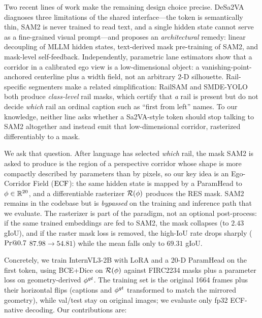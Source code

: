 Two recent lines of work make the remaining design choice precise.
DeSa2VA \citep{dang2025desa2va} diagnoses three limitations of the shared \Seg{} interface---the token is semantically thin, SAM2 is never trained to read text, and a single hidden state cannot serve as a fine-grained visual prompt---and proposes an \emph{architectural} remedy: linear decoupling of MLLM hidden states, text-derived mask pre-training of SAM2, and mask-level self-feedback.
Independently, parametric lane estimators \citep{tabelini2021polylanenet,feng2022bezierlanenet} show that a corridor in a calibrated ego view is a low-dimensional object: a vanishing-point-anchored centerline plus a width field, not an arbitrary 2-D silhouette.
Rail-specific segmenters make a related simplification: RailSAM \citep{zhang2025railsam} and SMDE-YOLO \citep{lin2026smdeyolo} both produce \emph{class-level} rail masks, which certify that \emph{a} rail is present but do not decide \emph{which} rail an ordinal caption such as ``first from left'' names.
To our knowledge, neither line asks whether a Sa2VA-style \Seg{} token should stop talking to SAM2 altogether and instead emit that low-dimensional corridor, rasterized differentiably to a mask.

We ask that question.
After language has selected \emph{which} rail, the mask SAM2 is asked to produce is the region of a perspective corridor whose shape is more compactly described by parameters than by pixels, so our key idea is an Ego-Corridor Field ($\mathrm{ECF}$): the same \Seg{} hidden state is mapped by a ParamHead to $\phi \in \mathbb{R}^{20}$, and a differentiable rasterizer $\mathcal{R}(\phi)$ produces the RES mask.
SAM2 remains in the codebase but is \emph{bypassed} on the training and inference path that we evaluate.
The rasterizer is part of the paradigm, not an optional post-process: if the same trained embeddings are fed to SAM2, the mask collapses (to $2.43$ gIoU), and if the raster mask loss is removed, the high-IoU rate drops sharply ($\mathrm{Pr@}0.7$ $87.98\to54.81$) while the mean falls only to $69.31$ gIoU.

Concretely, we train InternVL3-2B with LoRA and a 20-D ParamHead on the first \Seg{} token, using BCE+Dice on $\mathcal{R}(\phi)$ against FIRC2234 masks plus a parameter loss on geometry-derived $\phi^{gt}$.
The training set is the original 1664 frames plus their horizontal flips (captions and $\phi^{gt}$ transformed to match the mirrored geometry), while val/test stay on original images; we evaluate only fp32 ECF-native decoding.
Our contributions are:

